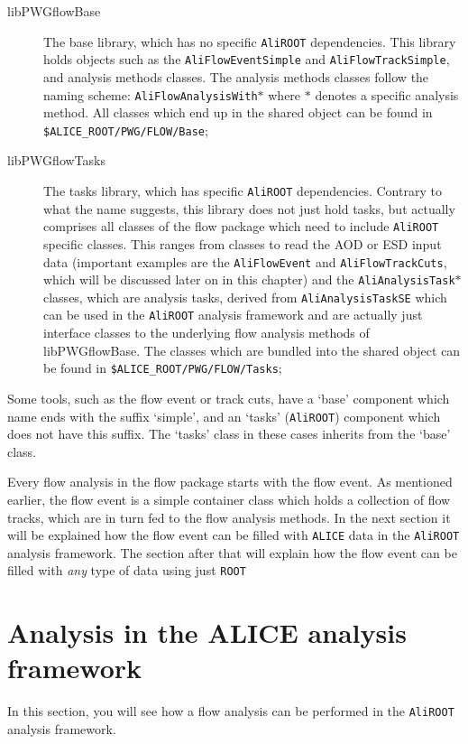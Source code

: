 \documentclass[a4paper]{book}
\numberwithin{equation}{subsection}
\begin{document}
\begin{description}
    \item [libPWGflowBase] The base library, which has no specific \texttt{AliROOT} dependencies. This library holds objects such as the \texttt{AliFlowEventSimple} and \texttt{AliFlowTrackSimple}, and analysis methods classes. The analysis methods classes follow the naming scheme: \texttt{AliFlowAnalysisWith$\ast$} where $\ast$ denotes a specific analysis method. All classes which end up in the  shared object can be found in \texttt{\$ALICE\_ROOT/PWG/FLOW/Base};
    \item [libPWGflowTasks]  The tasks library, which has specific \texttt{AliROOT} dependencies. Contrary to what the name suggests, this library does not just hold tasks, but actually comprises all classes of the flow package which need to include \texttt{AliROOT} specific classes. This ranges from classes to read the AOD or ESD input data (important examples are the \texttt{AliFlowEvent} and \texttt{AliFlowTrackCuts}, which will be discussed later on in this chapter) and the \texttt{AliAnalysisTask$\ast$} classes, which are analysis tasks, derived from \texttt{AliAnalysisTaskSE} which can be used in the \texttt{AliROOT} analysis framework and are actually just interface classes to the underlying flow analysis methods of libPWGflowBase. The classes which are bundled into the  shared object can be found in \texttt{\$ALICE\_ROOT/PWG/FLOW/Tasks};
\end{description}
Some tools, such as the flow event or track cuts, have a `base' component which name ends with the suffix `simple', and an `tasks' (\texttt{AliROOT}) component which does not have this suffix. The `tasks' class in these cases inherits from the `base' class. 

Every flow analysis in the flow package starts with the flow event. As mentioned earlier, the flow event is a simple container class which holds a collection of flow tracks, which are in turn fed to the flow analysis methods. In the next section it will be explained how the flow event can be filled with \texttt{ALICE} data in the \texttt{AliROOT} analysis framework. The section after that will explain how the flow event can be filled with \emph{any} type of data using just \texttt{ROOT}

\section{Analysis in the ALICE analysis framework}
In this section, you will see how a flow analysis can be performed in the \texttt{AliROOT} analysis framework.
\end{document}
